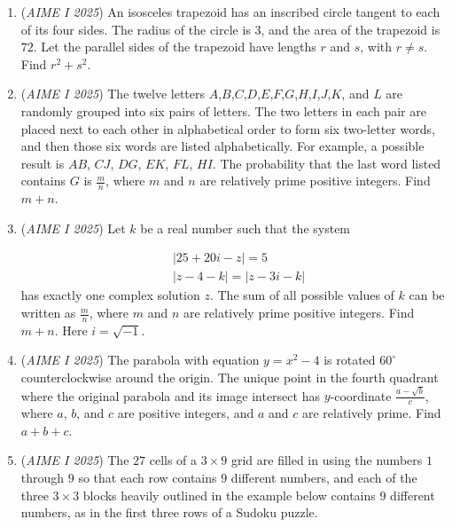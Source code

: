 \begin{enumerate}
 

	\item (\textit{AIME I 2025}) An isosceles trapezoid has an inscribed circle tangent to each of its four sides. The radius of the circle is $3$, and the area of the trapezoid is $72$. Let the parallel sides of the trapezoid have lengths $r$ and $s$, with $r \neq s$. Find $r^2 + s^2$.


 

	\item (\textit{AIME I 2025}) The twelve letters $A$,$B$,$C$,$D$,$E$,$F$,$G$,$H$,$I$,$J$,$K$, and $L$ are randomly grouped into six pairs of letters. The two letters in each pair are placed next to each other in alphabetical order to form six two-letter words, and then those six words are listed alphabetically. For example, a possible result is $AB$, $CJ$, $DG$, $EK$, $FL$, $HI$. The probability that the last word listed contains $G$ is $\frac mn$, where $m$ and $n$ are relatively prime positive integers. Find $m+n$.


 

	\item (\textit{AIME I 2025}) Let $k$ be a real number such that the system

 \begin{align*} &|25 + 20i - z| = 5 \\ &|z - 4 - k| = |z - 3i - k| \end{align*}
has exactly one complex solution $z$. The sum of all possible values of $k$ can be written as $\frac{m}{n}$, where $m$ and $n$ are relatively prime positive integers. Find $m + n$. Here $i = \sqrt{-1}$.


 

	\item (\textit{AIME I 2025}) The parabola with equation $y = x^2 - 4$ is rotated $60^{\circ}$ counterclockwise around the origin. The unique point in the fourth quadrant where the original parabola and its image intersect has $y$-coordinate $\frac{a - \sqrt{b}}{c}$, where $a$, $b$, and $c$ are positive integers, and $a$ and $c$ are relatively prime. Find $a + b + c$.


 

	\item (\textit{AIME I 2025}) The $27$ cells of a $3 \times 9$ grid are filled in using the numbers $1$ through $9$ so that each row contains $9$ different numbers, and each of the three $3 \times 3$ blocks heavily outlined in the example below contains $9$ different numbers, as in the first three rows of a Sudoku puzzle. 



\end{enumerate}
